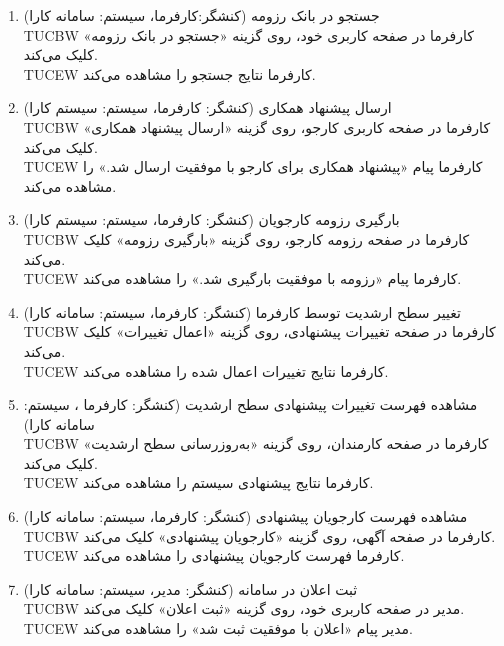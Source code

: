 \documentclass[12pt]{article}
\begin{document}
\begin{enumerate}
		\item
		جستجو در بانک رزومه (کنشگر:‌کارفرما، سیستم: سامانه کارا)\\
		TUCBW کارفرما در صفحه کاربری خود،‌ روی گزینه «جستجو در بانک رزومه» کلیک می‌کند.\\
		TUCEW کارفرما نتایج جستجو را مشاهده می‌کند.\\

		\item
		ارسال پیشنهاد همکاری (کنشگر: کارفرما، سیستم: سیستم کارا)\\
		TUCBW کارفرما در صفحه کاربری کارجو، روی گزینه «ارسال پیشنهاد همکاری» کلیک می‌کند.\\
		TUCEW کارفرما پیام «پیشنهاد همکاری برای کارجو با موفقیت ارسال شد.» را مشاهده می‌کند.\\

		\item
		بارگیری رزومه کارجویان (کنشگر: کارفرما، سیستم: سیستم کارا)\\
		TUCBW کارفرما در صفحه رزومه کارجو، روی گزینه «بارگیری رزومه» کلیک می‌کند.\\
		TUCEW کارفرما پیام «رزومه با موفقیت بارگیری شد.» را مشاهده می‌کند.\\

		\item
		تغییر سطح ارشدیت توسط کارفرما (کنشگر: کارفرما، سیستم: سامانه کارا)\\
		TUCBW کارفرما در صفحه تغییرات پیشنهادی، روی گزینه «اعمال تغییرات» کلیک می‌کند.\\
		TUCEW کارفرما نتایج تغییرات اعمال شده را مشاهده می‌کند.\\

		\item
		مشاهده فهرست تغییرات پیشنهادی سطح ارشدیت (کنشگر: کارفرما ، سیستم: سامانه کارا)\\
		TUCBW کارفرما در صفحه کارمندان، روی گزینه «به‌روزرسانی سطح ارشدیت» کلیک می‌کند.\\
		TUCEW کارفرما نتایج پیشنهادی سیستم را مشاهده می‌کند.\\

		\item
		مشاهده فهرست کارجویان پیشنهادی (کنشگر: کارفرما، سیستم: سامانه کارا)\\
		TUCBW کارفرما در صفحه آگهی، روی گزینه «کارجویان پیشنهادی» کلیک می‌کند.\\
		TUCEW کارفرما فهرست کارجویان پیشنهادی را مشاهده می‌کند.\\

		\item
		ثبت اعلان در سامانه (کنشگر: مدیر، سیستم: سامانه کارا)\\
		TUCBW مدیر در صفحه کاربری خود، روی گزینه «ثبت اعلان» کلیک می‌کند.\\
		TUCEW مدیر پیام «اعلان با موفقیت ثبت شد» را مشاهده می‌کند.\\


\end{enumerate}
\end{document}
